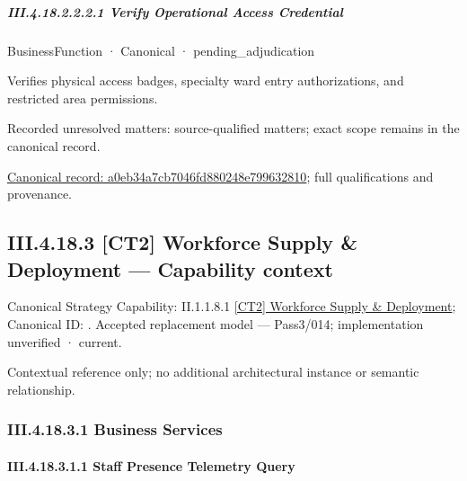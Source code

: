 \subparagraph*{III.4.18.2.2.2.1 Verify Operational Access Credential}
\label{navigation:III.4.18.2.2.2.1}

\label{element:a0eb34a7cb7046fd880248e799632810}
{\small BusinessFunction · Canonical · pending\_adjudication}\par

Verifies physical access badges, specialty ward entry authorizations, and restricted area permissions.


{\small Recorded unresolved matters: source-qualified matters; exact scope remains in the canonical record.}\par
{\footnotesize \href{../../../../../../../../continuum/business/business-function/a0eb34a7cb7046fd880248e799632810.md}{Canonical record: a0eb34a7cb7046fd880248e799632810}; full qualifications and provenance.}\par
\subsection*{III.4.18.3 [CT2] Workforce Supply \& Deployment — Capability context}
\label{navigation:III.4.18.3}

{\small Canonical Strategy Capability: II.1.1.8.1 \hyperref[element:eacad022ee104fb3a6b21791a7abf19f]{[CT2] Workforce Supply \& Deployment}; Canonical ID: \texttt{}. Accepted replacement model — Pass3/014; implementation unverified · current.}\par
Contextual reference only; no additional architectural instance or semantic relationship.\par
\subsubsection*{III.4.18.3.1 Business Services}
\label{navigation:III.4.18.3.1}

\paragraph*{III.4.18.3.1.1 Staff Presence Telemetry Query}
\label{navigation:III.4.18.3.1.1}

